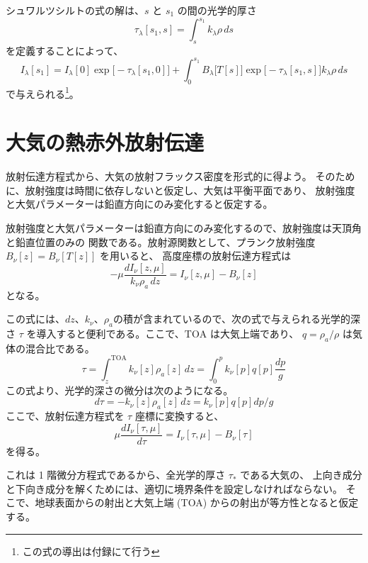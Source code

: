 \documentclass[book]{dennou777}
\begin{document}
シュワルツシルトの式の解は、\(s\) と \(s_1\) の間の光学的厚さ
\begin{equation}
	\tau_\lambda[s_1,s]=\int^{s_1}_s k_\lambda\rho\,ds
\end{equation}
を定義することによって、
\begin{equation}
	I_\lambda[s_1]=I_\lambda[0]\exp\bigl[-\tau_\lambda[s_1,0]\bigr]+
	\int^{s_1}_{0}B_\lambda\bigl[T[s]\bigr]\exp\bigl[-\tau_\lambda[s_1,s]\bigr]k_\lambda\rho\,ds
\end{equation}
で与えられる\footnote{この式の導出は付録にて行う}。


\section{大気の熱赤外放射伝達}
放射伝達方程式から、大気の放射フラックス密度を形式的に得よう。
そのために、放射強度は時間に依存しないと仮定し、大気は平衡平面であり、
放射強度と大気パラメーターは鉛直方向にのみ変化すると仮定する。

放射強度と大気パラメーターは鉛直方向にのみ変化するので、放射強度は天頂角と鉛直位置のみの
関数である。放射源関数として、プランク放射強度 \(B_\nu[z]=B_\nu[T[z]]\) を用いると、
高度座標の放射伝達方程式は
\begin{equation}
	-\mu\frac{dI_\nu[z,\mu]}{k_\nu\rho_a\,dz}=I_\nu[z,\mu]-B_\nu[z]
\end{equation}
となる。

この式には、\(dz\)、\(k_\nu\)、\(\rho_a\)の積が含まれているので、次の式で与えられる光学的深さ
\(\tau\) を導入すると便利である。ここで、\(\mathrm{TOA}\) は大気上端であり、
\(q=\rho_a/\rho\) は気体の混合比である。
\begin{equation}
	\tau=\int^{\mathrm{TOA}}_{z} k_\nu[z]\rho_a[z]\,dz=\int^p_0 k_\nu[p]q[p]\frac{dp}{g}
\end{equation}
この式より、光学的深さの微分は次のようになる。
\begin{equation}
	d\tau=-k_\nu[z]\rho_a[z]\,dz=k_\nu[p]q[p]dp/g
\end{equation}
ここで、放射伝達方程式を \(\tau\) 座標に変換すると、
\begin{equation}
	\mu\frac{dI_\nu[\tau,\mu]}{d\tau}=I_\nu[\tau,\mu]-B_\nu[\tau]
\end{equation}
を得る。

これは 1 階微分方程式であるから、全光学的厚さ \(\tau_*\) である大気の、
上向き成分と下向き成分を解くためには、適切に境界条件を設定しなければならない。
そこで、地球表面からの射出と大気上端 (TOA) からの射出が等方性となると仮定する。
\end{document}
